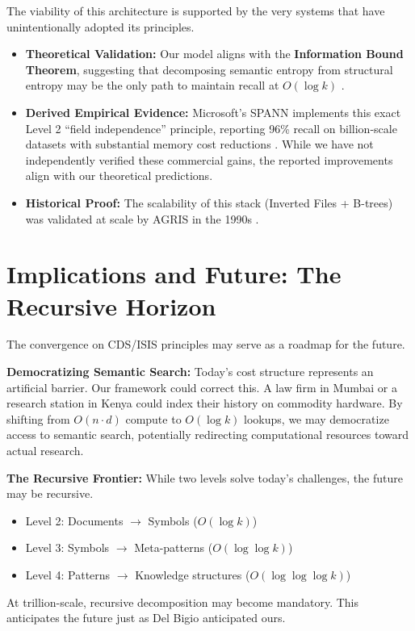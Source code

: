 \documentclass[manuscript,screen,nonacm]{acmart}
\begin{document}
The viability of this architecture is supported by the very systems that have unintentionally adopted its principles.
\begin{itemize}
    \item \textbf{Theoretical Validation:} Our model aligns with the \textbf{Information Bound Theorem}, suggesting that decomposing semantic entropy from structural entropy may be the only path to maintain recall at $O(\log k)$ \cite{korten2025}.
    \item \textbf{Derived Empirical Evidence:} Microsoft's SPANN implements this exact Level 2 ``field independence'' principle, reporting 96\% recall on billion-scale datasets with substantial memory cost reductions \cite{chen2021}. While we have not independently verified these commercial gains, the reported improvements align with our theoretical predictions.
    \item \textbf{Historical Proof:} The scalability of this stack (Inverted Files + B-trees) was validated at scale by AGRIS in the 1990s \cite{fao2005}.
\end{itemize}

\section{Implications and Future: The Recursive Horizon}

The convergence on CDS/ISIS principles may serve as a roadmap for the future.

\textbf{Democratizing Semantic Search:}
Today's cost structure represents an artificial barrier. Our framework could correct this. A law firm in Mumbai or a research station in Kenya could index their history on commodity hardware. By shifting from $O(n \cdot d)$ compute to $O(\log k)$ lookups, we may democratize access to semantic search, potentially redirecting computational resources toward actual research.

\textbf{The Recursive Frontier:}
While two levels solve today's challenges, the future may be recursive.
\begin{itemize}
    \item Level 2: Documents $\rightarrow$ Symbols ($O(\log k)$)
    \item Level 3: Symbols $\rightarrow$ Meta-patterns ($O(\log \log k)$)
    \item Level 4: Patterns $\rightarrow$ Knowledge structures ($O(\log \log \log k)$)
\end{itemize}
At trillion-scale, recursive decomposition may become mandatory. This anticipates the future just as Del Bigio anticipated ours.
\end{document}
